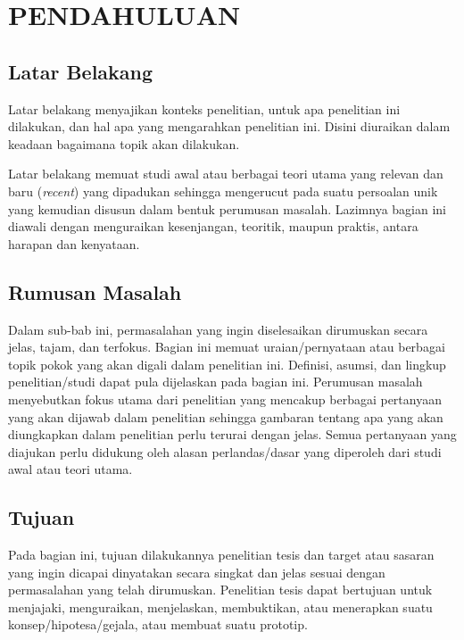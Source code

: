
\chapter{PENDAHULUAN}

\section{Latar Belakang}

Latar belakang menyajikan konteks penelitian, untuk apa penelitian ini dilakukan, dan hal apa yang mengarahkan penelitian ini. Disini diuraikan dalam keadaan bagaimana topik akan dilakukan.

Latar belakang memuat studi awal atau berbagai teori utama yang relevan dan baru (\emph{recent}) yang dipadukan sehingga mengerucut pada suatu persoalan unik yang kemudian disusun dalam bentuk perumusan masalah. Lazimnya bagian ini diawali dengan menguraikan kesenjangan, teoritik, maupun praktis, antara harapan dan kenyataan.

\section{Rumusan Masalah}

Dalam sub-bab ini, permasalahan yang ingin diselesaikan dirumuskan secara jelas, tajam, dan terfokus. Bagian ini memuat uraian/pernyataan atau berbagai topik pokok yang akan digali dalam penelitian ini. Definisi, asumsi, dan lingkup penelitian/studi dapat pula dijelaskan pada bagian ini. Perumusan masalah menyebutkan fokus utama dari penelitian yang mencakup berbagai pertanyaan yang akan dijawab dalam penelitian sehingga gambaran tentang apa yang akan diungkapkan dalam penelitian perlu terurai dengan jelas. Semua pertanyaan yang diajukan perlu didukung oleh alasan perlandas/dasar yang diperoleh dari studi awal atau teori utama.

\section{Tujuan}

Pada bagian ini, tujuan dilakukannya penelitian tesis dan target atau sasaran yang ingin dicapai dinyatakan secara singkat dan jelas sesuai dengan permasalahan yang telah dirumuskan. Penelitian tesis dapat bertujuan untuk menjajaki, menguraikan, menjelaskan, membuktikan, atau menerapkan suatu konsep/hipotesa/gejala, atau membuat suatu prototip.

